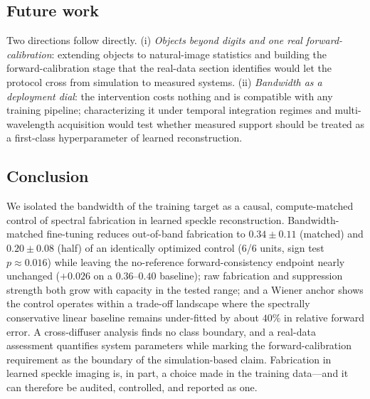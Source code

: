 \subsection{Future work}

Two directions follow directly. (i) \emph{Objects beyond digits and one real forward-calibration}: extending objects to natural-image statistics and building the forward-calibration stage that the real-data section identifies would let the protocol cross from simulation to measured systems. (ii) \emph{Bandwidth as a deployment dial}: the intervention costs nothing and is compatible with any training pipeline; characterizing it under temporal integration regimes and multi-wavelength acquisition would test whether measured support should be treated as a first-class hyperparameter of learned reconstruction.

\subsection{Conclusion}

We isolated the bandwidth of the training target as a causal, compute-matched control of spectral fabrication in learned speckle reconstruction. Bandwidth-matched fine-tuning reduces out-of-band fabrication to $0.34 \pm 0.11$ (matched) and $0.20 \pm 0.08$ (half) of an identically optimized control (6/6 units, sign test $p \approx 0.016$) while leaving the no-reference forward-consistency endpoint nearly unchanged ($+0.026$ on a $0.36$--$0.40$ baseline); raw fabrication and suppression strength both grow with capacity in the tested range; and a Wiener anchor shows the control operates within a trade-off landscape where the spectrally conservative linear baseline remains under-fitted by about $40\%$ in relative forward error. A cross-diffuser analysis finds no class boundary, and a real-data assessment quantifies system parameters while marking the forward-calibration requirement as the boundary of the simulation-based claim. Fabrication in learned speckle imaging is, in part, a choice made in the training data---and it can therefore be audited, controlled, and reported as one.

